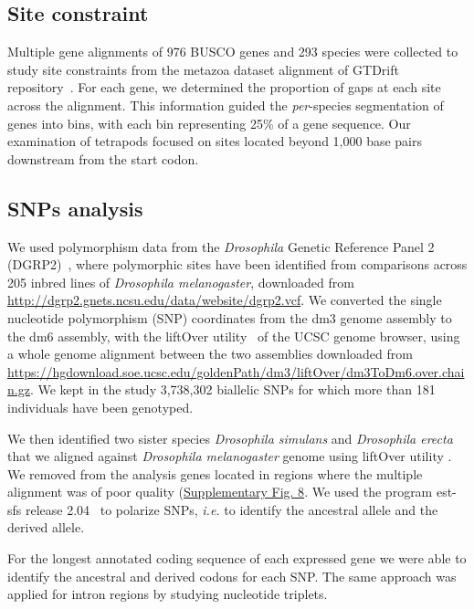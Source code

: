 \subsection{Site constraint}

Multiple gene alignments of 976 BUSCO genes and 293 species were collected to study site constraints from the metazoa dataset alignment of GTDrift repository~\citep{benitiere_gtdrift_2024}. For each gene, we determined the proportion of gaps at each site across the alignment. This information guided the \textit{per}-species segmentation of genes into bins, with each bin representing 25\% of a gene sequence. Our examination of tetrapods focused on sites located beyond 1,000 base pairs downstream from the start codon.


\subsection{SNPs analysis}

We used polymorphism data from the \textit{Drosophila} Genetic Reference Panel 2 (DGRP2)~\citep{mackay_drosophila_2012, huang_natural_2014}, where polymorphic sites have been identified from comparisons across 205 inbred lines of \textit{Drosophila melanogaster}, downloaded from \url{http://dgrp2.gnets.ncsu.edu/data/website/dgrp2.vcf}. We converted the single nucleotide polymorphism (SNP) coordinates from the dm3 genome assembly to the dm6 assembly, with the liftOver utility~\citep{hinrichs_ucsc_2006} of the UCSC genome browser, using a whole genome alignment between the two assemblies downloaded from \url{https://hgdownload.soe.ucsc.edu/goldenPath/dm3/liftOver/dm3ToDm6.over.chain.gz}. We kept in the study 3,738,302 biallelic SNPs for which more than 181 individuals have been genotyped.

We then identified two sister species \textit{Drosophila simulans} and \textit{Drosophila erecta} that we aligned against \textit{Drosophila melanogaster} genome using liftOver utility \citep{hinrichs_ucsc_2006}. We removed from the analysis genes located in regions where the multiple alignment was of poor quality (\hyperref[fig:CU8]{Supplementary Fig. 8}. We used the program est-sfs release 2.04~\citep{keightley_inferring_2018} to polarize SNPs, \textit{i.e.} to identify the ancestral allele and the derived allele. 

For the longest annotated coding sequence of each expressed gene we were able to identify the ancestral and derived codons for each SNP. The same approach was applied for intron regions by studying nucleotide triplets.

